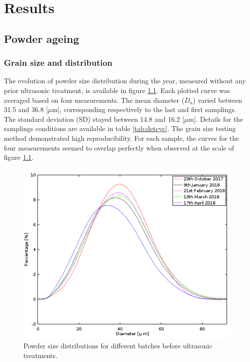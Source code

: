 \chapter{Results}
\label{Chap4}
\section{Powder ageing}

\subsection{Grain size and distribution}
\label{RGSAD}

The evolution of powder size distribution during the year, measured without any prior ultrasonic treatment, is available in figure \ref{fig:granulo}. Each plotted curve was averaged based on four measurements. The mean diameter ($D_a$) varied between 31.5 and 36.8 [$\mu$m], corresponding respectively to the last and first samplings. The standard deviation (SD) stayed between 14.8 and 16.2 [$\mu$m]. Details for the samplings conditions are available  in table \ref{tab:detcyc}. The grain size testing method demonstrated high reproducibility. For each sample, the curves for the four measurements seemed to overlap perfectly when observed at the scale of figure \ref{fig:granulo}.\\%

\begin{figure}[ht]
	\centering
	\includegraphics[scale=1]{Images/Granulo}
	\decoRule
	\caption[Powder size distributions for different batches before ultrasonic treatments.]{Powder size distributions for different batches before ultrasonic treatments.}
	\label{fig:granulo}
\end{figure}

